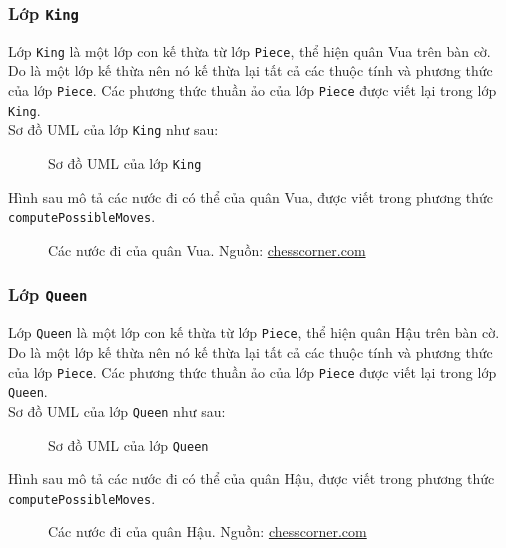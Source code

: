 \subsubsection{Lớp \lstinline{King}}
Lớp \lstinline{King} là một lớp con kế thừa từ lớp \lstinline{Piece}, thể hiện quân Vua trên bàn cờ. Do là một lớp kế thừa nên nó kế thừa lại tất cả các thuộc tính và phương thức của lớp \lstinline{Piece}. Các phương thức thuần ảo của lớp \lstinline{Piece} được viết lại trong lớp \lstinline{King}.\\
Sơ đồ UML của lớp \lstinline{King} như sau:
\begin{figure}[H]
\caption{Sơ đồ UML của lớp \lstinline{King}}
\end{figure}
Hình sau mô tả các nước đi có thể của quân Vua, được viết trong phương thức \lstinline{computePossibleMoves}.
\begin{figure}[H]
\caption{Các nước đi của quân Vua. Nguồn: \url{chesscorner.com}}
\end{figure}
\subsubsection{Lớp \lstinline{Queen}}
Lớp \lstinline{Queen} là một lớp con kế thừa từ lớp \lstinline{Piece}, thể hiện quân Hậu trên bàn cờ. Do là một lớp kế thừa nên nó kế thừa lại tất cả các thuộc tính và phương thức của lớp \lstinline{Piece}. Các phương thức thuần ảo của lớp \lstinline{Piece} được viết lại trong lớp \lstinline{Queen}.\\
Sơ đồ UML của lớp \lstinline{Queen} như sau:
\begin{figure}[H]
\caption{Sơ đồ UML của lớp \lstinline{Queen}}
\end{figure}
Hình sau mô tả các nước đi có thể của quân Hậu, được viết trong phương thức \lstinline{computePossibleMoves}.
\begin{figure}[H]
\caption{Các nước đi của quân Hậu. Nguồn: \url{chesscorner.com}}
\end{figure}
